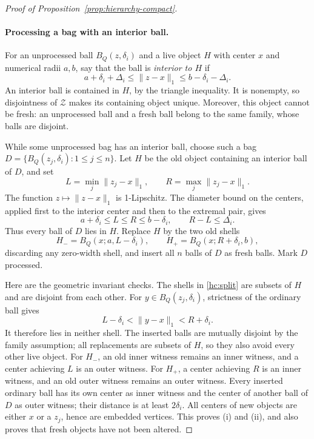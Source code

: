 \documentclass[11pt]{amsart}
\theoremstyle{definition}
\theoremstyle{remark}
\numberwithin{equation}{section}
\begin{document}
\begin{proof}[Proof of Proposition~\ref{prop:hierarchy-compact}]
\paragraph{Processing a bag with an interior ball.}
For an unprocessed ball \(B_Q(z,\delta_i)\) and a live object \(H\)
with center \(x\) and numerical radii \(a,b\), say that the ball is
\emph{interior to \(H\)} if
\begin{equation}
\label{hc:interior}
 a+\delta_i+\Delta_i\le\|z-x\|_1
 \le b-\delta_i-\Delta_i.
\end{equation}
An interior ball is contained in \(H\), by the triangle inequality.
It is nonempty, so disjointness of \(\mathcal Z\) makes its containing
object unique.  Moreover, this object cannot be fresh: an unprocessed
ball and a fresh ball belong to the same family, whose balls are
disjoint.

While some unprocessed bag has an interior ball, choose such a bag
\(D=\{B_Q(z_j,\delta_i):1\le j\le n\}\).  Let \(H\) be the old
object containing an interior ball of \(D\), and set
\[
 L=\min_j\|z_j-x\|_1,
 \qquad R=\max_j\|z_j-x\|_1.
\]
The function \(z\mapsto\|z-x\|_1\) is 1-Lipschitz.  The diameter
bound on the centers, applied first to the interior center and then
to the extremal pair, gives
\begin{equation}
\label{hc:radial-span}
 a+\delta_i\le L\le R\le b-\delta_i,
 \qquad R-L\le\Delta_i.
\end{equation}
Thus every ball of \(D\) lies in \(H\).
Replace \(H\) by the two old shells
\begin{equation}
\label{hc:split}
 H_-=B_Q(x;a,L-\delta_i),
 \qquad H_+=B_Q(x;R+\delta_i,b),
\end{equation}
discarding any zero-width shell, and insert all \(n\) balls of \(D\)
as fresh balls.  Mark \(D\) processed.

Here are the geometric invariant checks.  The shells in
\eqref{hc:split} are subsets of \(H\) and are disjoint from each other.
For \(y\in B_Q(z_j,\delta_i)\), strictness of the ordinary ball gives
\[
 L-\delta_i<\|y-x\|_1<R+\delta_i.
\]
It therefore lies in neither shell.  The inserted balls are mutually
disjoint by the family assumption; all replacements are subsets of
\(H\), so they also avoid every other live object.
For \(H_-\), an old inner witness remains an inner witness, and a
center achieving \(L\) is an outer witness.  For \(H_+\), a center
achieving \(R\) is an inner witness, and an old outer witness remains
an outer witness.  Every inserted ordinary ball has its own center
as inner witness and the center of another ball of \(D\) as outer
witness; their distance is at least \(2\delta_i\).
All centers of new objects are either \(x\) or a \(z_j\), hence are
embedded vertices.  This proves (i) and (ii), and also proves that
fresh objects have not been altered.


\end{proof}
\end{document}
